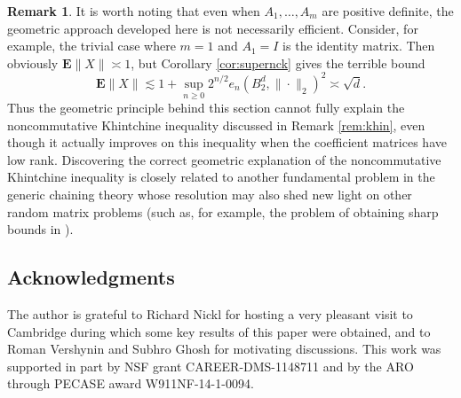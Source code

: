 \documentclass[10pt,reqno]{amsart}
\theoremstyle{definition}
\newtheorem{rem}[thm]{Remark}
\numberwithin{equation}{section}
\numberwithin{figure}{section}
\numberwithin{table}{section}
\begin{document}
\begin{rem}
It is worth noting that even when $A_1,\ldots,A_m$ are positive definite, 
the geometric approach developed here is not necessarily efficient. 
Consider, for example, the trivial case where $m=1$ and $A_1=I$ is the 
identity matrix. Then obviously $\mathbf{E}\|X\|\asymp 1$, but Corollary 
\ref{cor:supernck} gives the terrible bound
$$
	\mathbf{E}\|X\| \lesssim 1 + \sup_{n\ge 0} 
	2^{n/2}e_n(B_2^d,\|\cdot\|_2)^2 \asymp \sqrt{d}.
$$
Thus the geometric principle behind this section cannot fully explain the 
noncommutative Khintchine inequality discussed in Remark \ref{rem:khin}, 
even though it actually improves on this inequality when the coefficient 
matrices have low rank. Discovering the correct geometric explanation of 
the noncommutative Khintchine inequality is closely related to another 
fundamental problem in the generic chaining theory \cite[pp.\ 
50--51]{Tal14} whose resolution may also shed new light on other random 
matrix problems (such as, for example, the problem of obtaining sharp 
bounds in \cite{RV08}).
\end{rem}


\subsection*{Acknowledgments}

The author is grateful to Richard Nickl for hosting a very pleasant visit 
to Cambridge during which some key results of this paper were obtained, 
and to Roman Vershynin and Subhro Ghosh for motivating discussions. This 
work was supported in part by NSF grant CAREER-DMS-1148711 and by the ARO 
through PECASE award W911NF-14-1-0094.


%
%
\end{document}
